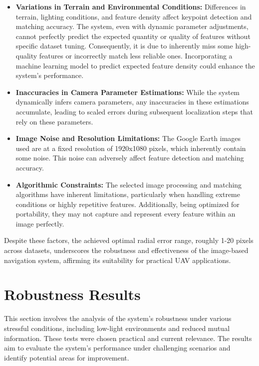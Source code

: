 \begin{itemize}
    \item \textbf{Variations in Terrain and Environmental Conditions:} Differences in terrain, lighting conditions, and feature density affect keypoint detection and matching accuracy. The system, even with dynamic parameter adjustments, cannot perfectly predict the expected quantity or quality of features without specific dataset tuning. Consequently, it is due to inherently miss some high-quality features or incorrectly match less reliable ones. Incorporating a machine learning model to predict expected feature density could enhance the system's performance.
    
    \item \textbf{Inaccuracies in Camera Parameter Estimations:} While the system dynamically infers camera parameters, any inaccuracies in these estimations accumulate, leading to scaled errors during subsequent localization steps that rely on these parameters.
    
    \item \textbf{Image Noise and Resolution Limitations:} The Google Earth images used are at a fixed resolution of 1920x1080 pixels, which inherently contain some noise. This noise can adversely affect feature detection and matching accuracy.
    
    \item \textbf{Algorithmic Constraints:} The selected image processing and matching algorithms have inherent limitations, particularly when handling extreme conditions or highly repetitive features. Additionally, being optimized for portability, they may not capture and represent every feature within an image perfectly.
\end{itemize}

Despite these factors, the achieved optimal radial error range, roughly 1-20 pixels across datasets, underscores the robustness and effectiveness of the image-based navigation system, affirming its suitability for practical UAV applications.

\section{Robustness Results}

This section involves the analysis of the system's robustness under various stressful conditions, including low-light environments and reduced mutual information. These tests were chosen practical and current relevance. The results aim to evaluate the system's performance under challenging scenarios and identify potential areas for improvement.


